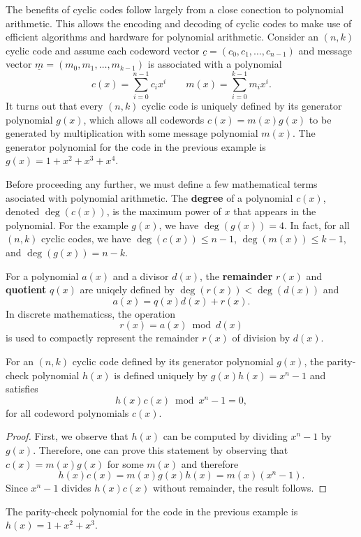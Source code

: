 The benefits of cyclic codes follow largely from a close conection to polynomial arithmetic.
This allows the encoding and decoding of cyclic codes to make use of efficient algorithms and hardware for polynomial arithmetic.
Consider an $(n,k)$ cyclic code and assume each codeword vector $\underline{c}=(c_0,c_1,\ldots,c_{n-1})$ and message vector $\underline{m}=(m_0,m_1,\ldots,m_{k-1})$ is associated with a polynomial
\[ c(x) = \sum_{i=0}^{n-1} c_i x^i \quad \quad  m(x) = \sum_{i=0}^{k-1} m_i x^i. \]
It turns out that every $(n,k)$ cyclic code is uniquely defined by its generator polynomial $g(x)$, which allows all codewords $c(x)=m(x)g(x)$ to be generated by multiplication with some message polynomial $m(x)$.
The generator polynomial for the code in the previous example is $g(x) = 1 + x^2 + x^3 + x^4$.

Before proceeding any further, we must define a few mathematical terms asociated with polynomial arithmetic.
The \textbf{degree} of a polynomial $c(x)$, denoted $\deg\left( c(x) \right)$, is the maximum power of $x$ that appears in the polynomial.
For the example $g(x)$, we have $\deg \left( g(x) \right) = 4$.
In fact, for all $(n,k)$ cyclic codes, we have
$\deg \left( c(x) \right) \leq n-1$,
$\deg \left( m(x) \right) \leq k-1$, and
$\deg \left( g(x) \right) = n-k$.

For a polynomial $a(x)$ and a divisor $d(x)$, the \textbf{remainder} $r(x)$ and \textbf{quotient} $q(x)$  are uniqely defined by $\deg\left( r(x) \right) < \deg \left(d(x) \right)$ and
\[ a(x) = q(x) d(x) + r(x). \]
In discrete mathematicss, the  operation
\[ r(x) = a(x) \bmod d(x) \]
is used to compactly represent the remainder $r(x)$ of division by $d(x)$.
\begin{proposition}
For an $(n,k)$ cyclic code defined by its generator polynomial $g(x)$, the parity-check polynomial $h(x)$ is defined uniquely by $g(x)h(x)=x^n - 1$ and satisfies
\[ h(x)c(x) \bmod x^n - 1 = 0, \]
for all codeword polynomials $c(x)$.
\end{proposition}
\begin{proof}
First, we observe that $h(x)$ can be computed by dividing $x^n -1$ by $g(x)$.
Therefore, one can prove this statement by observing that $c(x)=m(x)g(x)$ for some $m(x)$ and therefore
\[ h(x)c(x) = m(x)g(x)h(x) = m(x)(x^n - 1). \]
Since $x^n -1$ divides $h(x)c(x)$ without remainder, the result follows.
\end{proof}
The parity-check polynomial for the code in the previous example is $h(x) = 1 + x^2 + x^3$.

